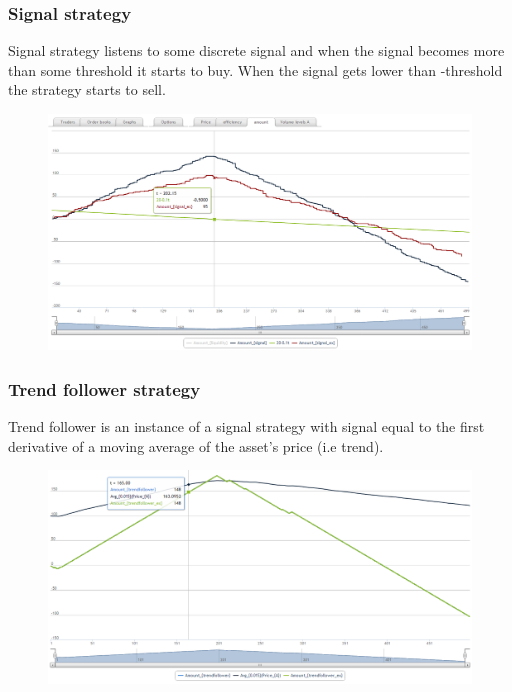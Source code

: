 \documentclass{beamer}
\begin{document}
\begin{frame}
\frametitle{Signal strategy}
Signal strategy listens to some discrete signal and when the signal becomes more than some threshold it starts to buy. When the signal gets lower than -threshold the strategy starts to sell.
\begin{figure}[htbp]
\centering
\includegraphics[width=1\linewidth]{signal.png}
\end{figure}
\end{frame}


\begin{frame}
\frametitle{Trend follower strategy}
Trend follower is an instance of a signal strategy with signal equal to the first derivative of a moving average of the asset's price (i.e trend).
\begin{figure}[htbp]
\centering
\includegraphics[width=1\linewidth]{trendfollower.png}
\end{figure}
\end{frame}

\end{document}
